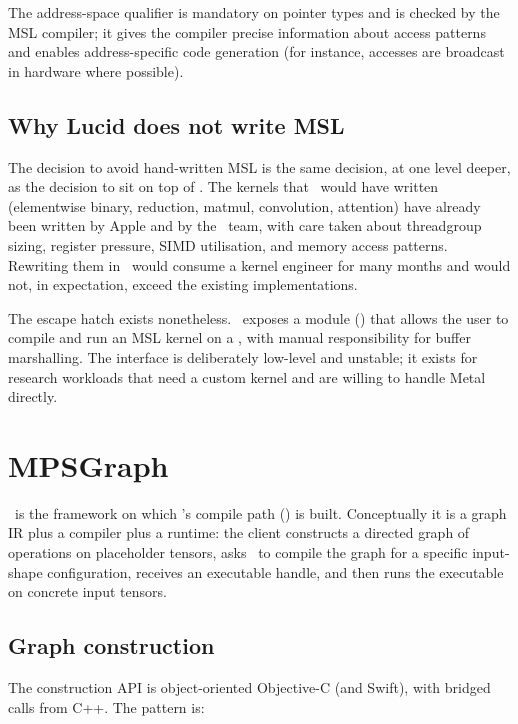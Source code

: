The address-space qualifier is mandatory on pointer types and is
checked by the MSL compiler; it gives the compiler precise
information about access patterns and enables address-specific code
generation (for instance,  accesses are broadcast in
hardware where possible).

\subsection{Why Lucid does not write MSL}
\label{ssec:metal_mpsgraph:no_msl}

The decision to avoid hand-written MSL is the same decision, at one
level deeper, as the decision to sit on top of \MLX. The kernels
that \Lucid\ would have written (elementwise binary, reduction,
matmul, convolution, attention) have already been written by Apple
and by the \MLX\ team, with care taken about threadgroup sizing,
register pressure, SIMD utilisation, and memory access patterns.
Rewriting them in \Lucid\ would consume a kernel engineer for many
months and would not, in expectation, exceed the existing
implementations.

The escape hatch exists nonetheless. \Lucid\ exposes a
 module
() that allows the user to compile and run
an MSL kernel on a , with manual responsibility for
buffer marshalling. The interface is deliberately low-level and
unstable; it exists for research workloads that need a custom
kernel and are willing to handle Metal directly.

\section{MPSGraph}
\label{sec:metal_mpsgraph:mpsgraph}

\MPSGraph\ is the framework on which \Lucid's compile path
() is built. Conceptually it is a graph IR
plus a compiler plus a runtime: the client constructs a directed
graph of operations on placeholder tensors, asks \MPSGraph\ to
compile the graph for a specific input-shape configuration,
receives an executable handle, and then runs the executable on
concrete input tensors.

\subsection{Graph construction}
\label{ssec:metal_mpsgraph:graph_construction}

The construction API is object-oriented Objective-C (and Swift),
with bridged calls from C++. The pattern is:

